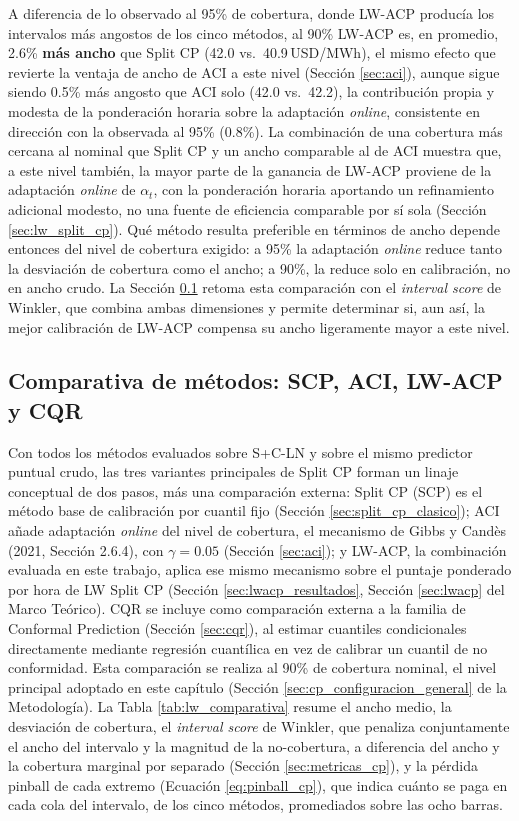 A diferencia de lo observado al 95\% de cobertura, donde LW-ACP producía los intervalos más angostos de los cinco métodos, al 90\% LW-ACP es, en promedio, 2.6\% \textbf{más ancho} que Split CP (42.0 vs.\ 40.9\,USD/MWh), el mismo efecto que revierte la ventaja de ancho de ACI a este nivel (Sección \ref{sec:aci}), aunque sigue siendo 0.5\% más angosto que ACI solo (42.0 vs.\ 42.2), la contribución propia y modesta de la ponderación horaria sobre la adaptación \textit{online}, consistente en dirección con la observada al 95\% (0.8\%). La combinación de una cobertura más cercana al nominal que Split CP y un ancho comparable al de ACI muestra que, a este nivel también, la mayor parte de la ganancia de LW-ACP proviene de la adaptación \textit{online} de $\alpha_t$, con la ponderación horaria aportando un refinamiento adicional modesto, no una fuente de eficiencia comparable por sí sola (Sección \ref{sec:lw_split_cp}). Qué método resulta preferible en términos de ancho depende entonces del nivel de cobertura exigido: a 95\% la adaptación \textit{online} reduce tanto la desviación de cobertura como el ancho; a 90\%, la reduce solo en calibración, no en ancho crudo. La Sección \ref{sec:lwacp_comparativa} retoma esta comparación con el \textit{interval score} de Winkler, que combina ambas dimensiones y permite determinar si, aun así, la mejor calibración de LW-ACP compensa su ancho ligeramente mayor a este nivel.

\subsection{Comparativa de métodos: SCP, ACI, LW-ACP y CQR}
\label{sec:lwacp_comparativa}

Con todos los métodos evaluados sobre S+C-LN y sobre el mismo predictor puntual crudo, las tres variantes principales de Split CP forman un linaje conceptual de dos pasos, más una comparación externa: Split CP (SCP) es el método base de calibración por cuantil fijo (Sección \ref{sec:split_cp_clasico}); ACI añade adaptación \textit{online} del nivel de cobertura, el mecanismo de Gibbs y Candès (2021, Sección 2.6.4), con $\gamma = 0.05$ (Sección \ref{sec:aci}); y LW-ACP, la combinación evaluada en este trabajo, aplica ese mismo mecanismo sobre el puntaje ponderado por hora de LW Split CP (Sección \ref{sec:lwacp_resultados}, Sección \ref{sec:lwacp} del Marco Teórico). CQR se incluye como comparación externa a la familia de Conformal Prediction (Sección \ref{sec:cqr}), al estimar cuantiles condicionales directamente mediante regresión cuantílica en vez de calibrar un cuantil de no conformidad. Esta comparación se realiza al 90\% de cobertura nominal, el nivel principal adoptado en este capítulo (Sección \ref{sec:cp_configuracion_general} de la Metodología). La Tabla \ref{tab:lw_comparativa} resume el ancho medio, la desviación de cobertura, el \textit{interval score} de Winkler, que penaliza conjuntamente el ancho del intervalo y la magnitud de la no-cobertura, a diferencia del ancho y la cobertura marginal por separado (Sección \ref{sec:metricas_cp}), y la pérdida pinball de cada extremo (Ecuación \ref{eq:pinball_cp}), que indica cuánto se paga en cada cola del intervalo, de los cinco métodos, promediados sobre las ocho barras.

